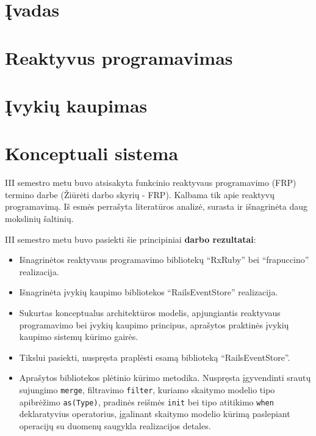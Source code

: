 \documentclass{VUMIFPSmagistrinis}
\begin{document}

\tableofcontents

\section{Įvadas}


\section{Reaktyvus programavimas}


\section{Įvykių kaupimas}


\section{Konceptuali sistema}



III semestro metu buvo atsisakyta funkcinio reaktyvaus programavimo (FRP) termino darbe (Žiūrėti darbo skyrių - FRP). Kalbama tik apie reaktyvų programavimą. Iš esmės perrašyta literatūros analizė, surasta ir išnagrinėta daug mokslinių šaltinių.

III semestro metu buvo pasiekti šie principiniai \textbf{darbo rezultatai}:

\begin{itemize}
  \item Išnagrinėtos reaktyvaus programavimo bibliotekų ``RxRuby'' bei ``frapuccino'' realizacija.
  \item Išnagrinėta įvykių kaupimo bibliotekos ``RailsEventStore'' realizacija.
  \item Sukurtas konceptualus architektūros modelis, apjungiantis reaktyvaus programavimo bei įvykių kaupimo principus, aprašytos praktinės įvykių kaupimo sistemų kūrimo gairės.
  \item Tikslui pasiekti, nuspręsta praplėsti esamą biblioteką ``RailsEventStore''.
  \item Aprašytos bibliotekos plėtinio kūrimo metodika. Nuspręsta įgyvendinti srautų sujungimo \lstinline|merge|, filtravimo \lstinline|filter|, kuriamo skaitymo modelio tipo apibrėžimo \lstinline|as(Type)|, pradinės reišmės \lstinline|init| bei tipo atitikimo \lstinline|when| deklaratyvius operatorius, įgalinant skaitymo modelio kūrimą paslepiant operacijų su duomenų saugykla realizacijos detales.
\end{itemize}
\end{document}
